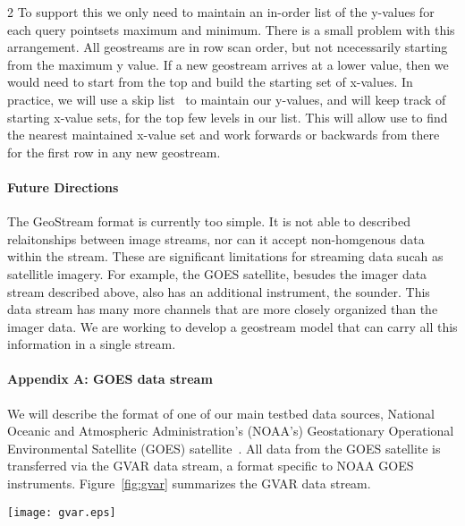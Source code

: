 \documentclass[10pt,letter]{article}
\begin{document}
\begin{multicols}{2}
To support this we only need to maintain an in-order list of the
y-values for each query pointsets maximum and minimum.  There is a
small problem with this arrangement.  All geostreams are in row scan
order, but not ncecessarily starting from the maximum y value.  If a
new geostream arrives at a lower value, then we would need to start
from the top and build the starting set of x-values.  In practice, we
will use a skip list~\cite{pugh:90:skip} to maintain our y-values, and
will keep track of starting x-value sets, for the top few levels in
our list.  This will allow use to find the nearest maintained x-value
set and work forwards or backwards from there for the first row in any
new geostream.

\paragraph{Future Directions}

The GeoStream format is currently too simple.  It is not able to
described relaitonships between image streams, nor can it accept
non-homgenous data within the stream.  These are significant
limitations for streaming data sucah as satellitle imagery.  For
example, the GOES satellite, besudes the imager data stream described
above, also has an additional instrument, the sounder.  This data
stream has many more channels that are more closely organized than the
imager data.  We are working to develop a geostream model that can
carry all this information in a single stream.




\paragraph{Appendix A: GOES data stream} 

We will describe the format of one of our main testbed data sources,
National Oceanic and Atmospheric Administration's (NOAA's)
Geostationary Operational Environmental Satellite (GOES)
satellite~\cite{goes}.  All data from the GOES satellite is
transferred via the GVAR data stream, a format specific to NOAA GOES
instruments.  Figure~\ref{fig:gvar} summarizes the GVAR data stream.

\begin{figure*}[htbp]
  \begin{center}
    \texttt{[image: gvar.eps]}
    \caption{GOES GVAR data stream}
    \label{fig:gvar}
  \end{center}
\end{figure*}


\end{multicols}
\end{document}

